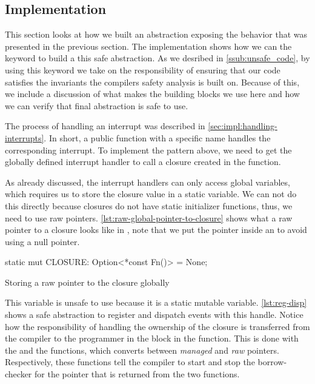 \subsection{Implementation}

This section looks at how we built an abstraction exposing the behavior that was presented in the previous section.
The implementation shows how we can the {\unsafe} keyword to build a this safe abstraction.
As we desribed in \autoref{ssub:unsafe_code}, by using this keyword we take on the responsibility of ensuring that our code satisfies the invariants the compilers safety analysis is built on.
Because of this, we include a discussion of what makes the building blocks we use here {\unsafe} and how we can verify that final abstraction is safe to use.

The process of handling an interrupt was described in \autoref{sec:impl:handling-interrupts}.
In short, a public function with a specific name handles the corresponding interrupt.
To implement the pattern above, we need to get the globally defined interrupt handler  to call a closure created in the  function.

As already discussed, the interrupt handlers can only access global variables, which requires us to store the closure value in a static variable.
We can not do this directly because closures do not have static initializer functions, thus, we need to use raw pointers.
\autoref{lst:raw-global-pointer-to-closure} shows what a raw pointer to a closure looks like in {\rust}, note that we put the pointer inside an  to avoid using a null pointer.

\begin{listing}[H]
  \begin{rustcode}
static mut CLOSURE: Option<*const Fn()> = None;
  \end{rustcode}
  \caption{Storing a raw pointer to the closure globally}
  \label{lst:raw-global-pointer-to-closure}
\end{listing}

This  variable is unsafe to use because it is a static mutable variable.
\autoref{lst:reg-disp} shows a safe abstraction to register and dispatch events with this handle.
Notice how the responsibility of handling the ownership of the closure is transferred from the compiler to the programmer in the {\unsafe} block in the  function.
This is done with the  and the  functions, which converts between \emph{managed} and \emph{raw} pointers.
Respectively, these functions tell the compiler to start and stop the borrow-checker for the pointer that is returned from the two functions.

